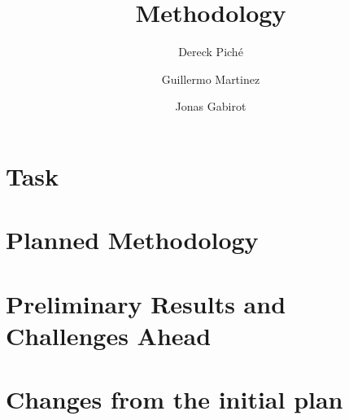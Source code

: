 \documentclass{article}
\title{Methodology}
\author
{
    Dereck Piché \and
    Guillermo Martinez \and
    Jonas Gabirot \and
}
\begin{document}
\maketitle

\section{Task}


\section{Planned Methodology}

\section{Preliminary Results and Challenges Ahead}

\section{Changes from the initial plan}
\end{document}
